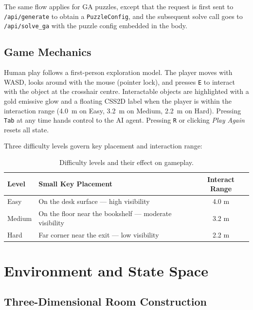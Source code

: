 \documentclass[12pt, a4paper]{report}
\begin{document}
The same flow applies for GA puzzles, except that the request is first sent to
\texttt{/api/generate} to obtain a \texttt{PuzzleConfig}, and the subsequent
solve call goes to \texttt{/api/solve\_ga} with the puzzle config embedded in
the body.

\section{Game Mechanics}

Human play follows a first-person exploration model.  The player moves with
WASD, looks around with the mouse (pointer lock), and presses \texttt{E} to
interact with the object at the crosshair centre.  Interactable objects are
highlighted with a gold emissive glow and a floating CSS2D label when the
player is within the interaction range (4.0~m on Easy, 3.2~m on Medium,
2.2~m on Hard).  Pressing \texttt{Tab} at any time hands control to the AI
agent.  Pressing \texttt{R} or clicking \textit{Play Again} resets all state.

Three difficulty levels govern key placement and interaction range:

\begin{table}[H]
\centering
\caption{Difficulty levels and their effect on gameplay.}
\label{tab:difficulty}
\begin{tabular}{lL{5cm}c}
\toprule
\textbf{Level} & \textbf{Small Key Placement} & \textbf{Interact Range} \\
\midrule
Easy   & On the desk surface --- high visibility & 4.0 m \\
Medium & On the floor near the bookshelf --- moderate visibility & 3.2 m \\
Hard   & Far corner near the exit --- low visibility & 2.2 m \\
\bottomrule
\end{tabular}
\end{table}

\chapter{Environment and State Space}
\label{chap:envstate}

\section{Three-Dimensional Room Construction}
\end{document}

